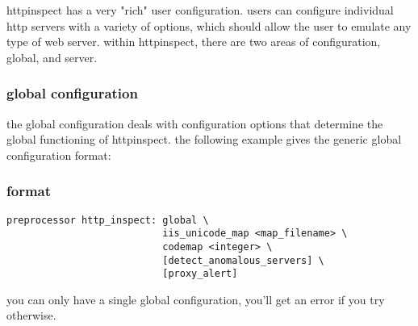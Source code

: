 \documentclass[english]{report}
\begin{document}
httpinspect has a very "rich" user configuration.  users can configure
individual http servers with a variety of options, which should allow the user
to emulate any type of web server. within httpinspect, there are two areas of
configuration, global, and server.

\subsubsection{global configuration}

the global configuration deals with configuration options that determine the
global functioning of httpinspect.  the following example gives the generic
global configuration format:

\subsubsection{format}
\begin{verbatim}
preprocessor http_inspect: global \
                           iis_unicode_map <map_filename> \
                           codemap <integer> \
                           [detect_anomalous_servers] \
                           [proxy_alert]
\end{verbatim}

you can only have a single global configuration, you'll get an error if you try
otherwise.
\end{document}

